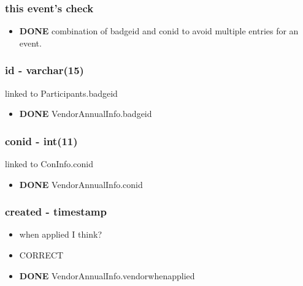 \documentclass[captions=tablesignature]{scrartcl}
\begin{document}
\subsubsection{this event's check}
\label{sec-2-2-1}
\begin{itemize}
\item {\bfseries\sffamily DONE} combination of badgeid and conid to avoid multiple entries for an event.
\label{sec-2-2-1-1}
\end{itemize}

\subsubsection{id - varchar(15)}
\label{sec-2-2-2}
linked to Participants.badgeid
\begin{itemize}
\item {\bfseries\sffamily DONE} VendorAnnualInfo.badgeid
\label{sec-2-2-2-1}
\end{itemize}

\subsubsection{conid - int(11)}
\label{sec-2-2-3}
linked to ConInfo.conid
\begin{itemize}
\item {\bfseries\sffamily DONE} VendorAnnualInfo.conid
\label{sec-2-2-3-1}
\end{itemize}

\subsubsection{created - timestamp}
\label{sec-2-2-4}
\begin{itemize}
\item when applied I think?
\item CORRECT
\end{itemize}
\begin{itemize}
\item {\bfseries\sffamily DONE} VendorAnnualInfo.vendorwhenapplied
\label{sec-2-2-4-1}
\end{itemize}
\end{document}
